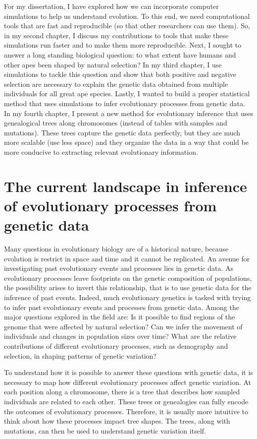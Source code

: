For my dissertation, I have explored how we can incorporate computer simulations to help us understand evolution.
To this end, we need computational tools that are fast and reproducible (so that other researchers can use them).
So, in my second chapter, I discuss my contributions to tools that make these simulations run faster and to make them more reproducible.
Next, I sought to answer a long standing biological question: to what extent have humans and other apes been shaped by natural selection?
In my third chapter, I use simulations to tackle this question and show that both positive and negative selection are necessary to explain the genetic data obtained from multiple individuals for all great ape species.
Lastly, I wanted to build a proper statistical method that uses simulations to infer evolutionary processes from genetic data.
In my fourth chapter, I present a new method for evolutionary inference that uses genealogical trees along chromosomes
(instead of tables with samples and mutations).
These trees capture the genetic data perfectly, but they are much more scalable (use less space) and
they organize the data in a way that could be more conducive to extracting relevant evolutionary information.

\section{The current landscape in inference of evolutionary processes from genetic data}

Many questions in evolutionary biology are of a historical nature,
because evolution is restrict in space and time and it cannot be replicated.
An avenue for investigating past evolutionary events and processes lies in genetic data.
As evolutionary processes leave footprints on the genetic composition of populations,
the possibility arises to invert this relationship,
that is to use genetic data for the inference of past events.
Indeed, much evolutionary genetics is tasked with trying to infer past evolutionary events and processes from genetic data.
Among the major questions explored in the field are: 
Is it possible to find regions of the genome that were affected by natural selection?
Can we infer the movement of individuals and changes in population sizes over time?
What are the relative contributions of different evolutionary processes, such as demography and selection, in shaping patterns of genetic variation? 


To understand how it is possible to answer these questions with genetic data,
it is necessary to map how different evolutionary processes affect genetic variation.
At each position along a chromosome, there is a tree that describes how sampled individuals are related to each other.
These trees or genealogies can fully encode the outcomes of evolutionary processes.
Therefore, it is usually more intuitive to think about how these processes impact tree shapes.
The trees, along with mutations, can then be used to understand genetic variation itself.

